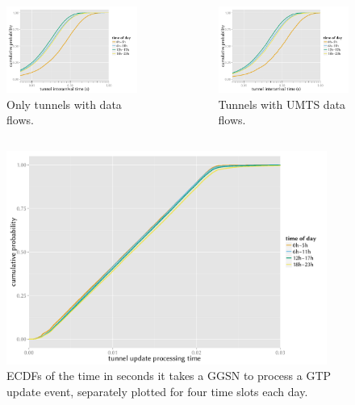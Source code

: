 \documentclass{beamer}
\begin{document}
\begin{frame}
\begin{columns}
		\begin{figure}
			\includegraphics[width=0.7\columnwidth]{../../chapters/04-mobilenets/images/R-IAT-fromflows-ecdfs-2h.pdf}
			\vspace{-4mm}
			\caption{Only tunnels with data flows.}
		\end{figure}
		\vspace{-10mm}
		\begin{figure}
			\includegraphics[width=0.7\columnwidth]{../../chapters/04-mobilenets/images/R-IAT-fromflows-umts-ecdfs-2h.pdf}
			\vspace{-4mm}
			\caption{Tunnels with UMTS data flows.}
		\end{figure}
	\end{columns}
\end{frame}

\begin{frame}
	\begin{figure}
		\centering
		\includegraphics[height=7cm]{../../chapters/04-mobilenets/images/R-update-time-cdfs.pdf}
		\caption{ECDFs of the time in seconds it takes a GGSN to process a GTP update event, separately plotted for four time slots each day.}
	\end{figure}
\end{frame}
\end{document}
